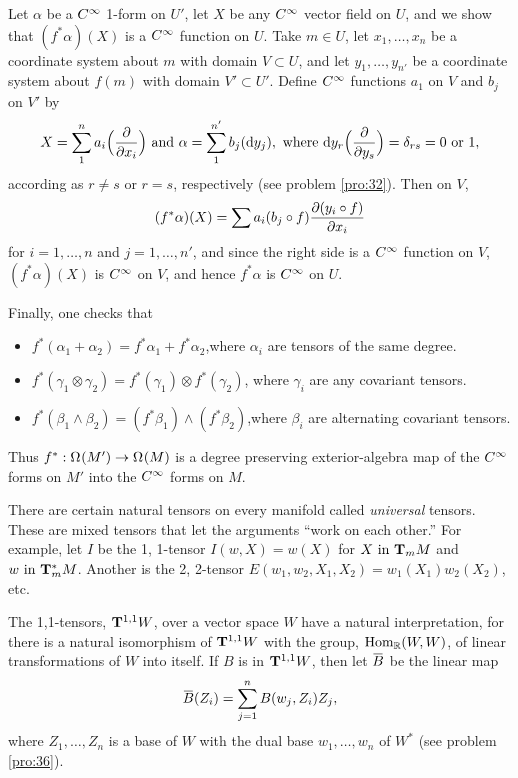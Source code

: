 \documentclass[../main]{subfiles}
\begin{document}
Let $\alpha$ be a $\CInfty$ 1-form on $U'$, let $X$ be any $\CInfty$ vector field on $U$, and we show that $(f^\ast\alpha)(X)$ is a $\CInfty$ function on $U$. Take $m\in U$, let $x_1,\dots, x_n$ be a coordinate system about $m$ with domain $V\subset U$, and let $y_1,\dots,y_{n'}$ be a coordinate system about $f(m)$ with domain $V'\subset U'$. Define $\CInfty$ functions $a_1$ on $V$ and $b_j$ on $V'$ by \[X = \sum_1^n a_i\Big(\pdv{}{x_i}\Big)\text{ and }\alpha = \sum_{1}^{n'} b_j(\dd y_j),\text{ where }\dd y_r\Big(\pdv{}{y_s}\Big) = \delta_{rs} = 0\text{ or }1,\] according as $r\ne s$ or $r=s$, respectively (see problem \ref{pro:32}). Then on $V$,
\[ (f^\ast \alpha)(X) = \sum a_i(b_j\circ f)\pdv{(y_i\circ f)}{x_i} \]
for $i=1,\dots, n$ and $j=1,\dots,n'$, and since the right side is a $\CInfty$ function on $V$, $(f^\ast \alpha)(X)$ is $\CInfty$ on $V$, and hence $f^*\alpha$ is $\CInfty$ on $U$.

Finally, one checks that
\begin{itemize}
    \item $ f^\ast(\alpha_1+\alpha_2) = f^\ast\alpha_1 +f^\ast\alpha_2$,where $\alpha_i$ are tensors of the same degree.
    \item $f^\ast(\gamma_1 \otimes \gamma_2) = f^\ast (\gamma_1) \otimes f^\ast (\gamma_2)$, where $\gamma_i$ are any covariant tensors.
    \item $f^\ast(\beta_1\wedge\beta_2) = (f^\ast\beta_1) \wedge (f^\ast \beta_2)$,where $\beta_i$ are alternating covariant tensors.
\end{itemize}
Thus $f^\ast:\formbundle{M'}{} \functionMaps \formbundle{M}{}$ is a degree preserving exterior-algebra map of the $\CInfty$ forms on $M'$ into the $\CInfty$ forms on $M$.

There are certain natural tensors on every manifold called \emph{universal} tensors. These are mixed tensors that let the arguments ``work on each other.'' For example, let $I$ be the 1, 1-tensor $I(w,X) = w(X)$ for $X \InText \tangentspace{M}{m}$ and $w \InText \cotangentspace{M}{m}$. Another is the 2, 2-tensor $E(w_1,w_2,X_1,X_2) = w_1(X_1)w_2(X_2)$, etc.

The 1,1-tensors, $\tensorbundle{W}{1}{ 1}$, over a vector space $W$ have a natural interpretation, for there is a natural isomorphism of $\tensorbundle{W}{1}{1}$ with the group, $\Hom_\bR(W,W)$, of linear transformations of $W$ into itself. If $B$ is in $\tensorbundle{W}{1}{ 1}$, then let $\xoverline B$ be the linear map \[\xoverline B(Z_i) = \sum_{j=1}^n B(w_j, Z_i)Z_j,\] where $Z_1,\dots,Z_n$ is a base of $W$ with the dual base $w_1,\dots,w_n$ of $W^*$ (see problem \ref{pro:36}).
\end{document}
